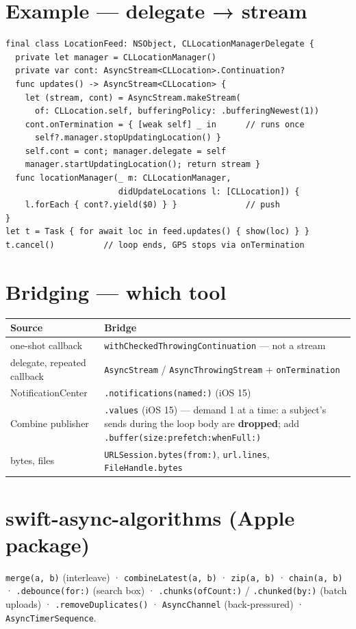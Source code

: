 \documentclass[8pt]{extarticle}
\begin{document}
\begin{multicols}{2}
\section{Example — delegate → stream}
\begin{lstlisting}[language=SwiftSheet]
final class LocationFeed: NSObject, CLLocationManagerDelegate {
  private let manager = CLLocationManager()
  private var cont: AsyncStream<CLLocation>.Continuation?
  func updates() -> AsyncStream<CLLocation> {
    let (stream, cont) = AsyncStream.makeStream(
      of: CLLocation.self, bufferingPolicy: .bufferingNewest(1))
    cont.onTermination = { [weak self] _ in      // runs once
      self?.manager.stopUpdatingLocation() }
    self.cont = cont; manager.delegate = self
    manager.startUpdatingLocation(); return stream }
  func locationManager(_ m: CLLocationManager,
                       didUpdateLocations l: [CLLocation]) {
    l.forEach { cont?.yield($0) } }              // push
}
let t = Task { for await loc in feed.updates() { show(loc) } }
t.cancel()          // loop ends, GPS stops via onTermination
\end{lstlisting}

\columnbreak

\section{Bridging — which tool}
{\footnotesize\setlength{\tabcolsep}{3pt}
\begin{tabular}{@{}L{22mm}L{53mm}@{}}
\toprule
\textbf{Source} & \textbf{Bridge} \\
\midrule
one-shot callback & \texttt{withCheckedThrowingContinuation} — not a stream \\
delegate, repeated callback & \texttt{AsyncStream} / \texttt{AsyncThrowingStream} + \texttt{onTermination} \\
NotificationCenter & \texttt{.notifications(named:)} (iOS 15) \\
Combine publisher & \texttt{.values} (iOS 15) — demand 1 at a time: a subject's sends
  during the loop body are \textbf{dropped}; add \texttt{.buffer(size:prefetch:whenFull:)} \\
bytes, files & \texttt{URLSession.bytes(from:)}, \texttt{url.lines}, \texttt{FileHandle.bytes} \\
\bottomrule
\end{tabular}}

\section{swift-async-algorithms (Apple package)}
\texttt{merge(a, b)} (interleave) · \texttt{combineLatest(a, b)} · \texttt{zip(a, b)} ·
\texttt{chain(a, b)} · \texttt{.debounce(for:)} (search box) ·
\texttt{.chunks(ofCount:)} / \texttt{.chunked(by:)} (batch uploads) ·
\texttt{.removeDuplicates()} · \texttt{AsyncChannel} (back-pressured) ·
\texttt{AsyncTimerSequence}.


\end{multicols}
\end{document}

